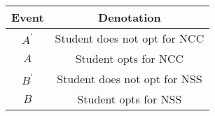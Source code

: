 \begin{tabular}[12pt]{ |c| c|} 
    \hline
    {Event} & {Denotation}\\ 
    \hline
    $A^\prime $ &  Student does not opt for NCC \\
    \hline 
    $ A $ & Student opts for NCC\\
    \hline
    $ B^\prime $ & Student does not opt for NSS\\
    \hline   
    $ B $ & Student opts for NSS \\
    \hline
\end{tabular}

